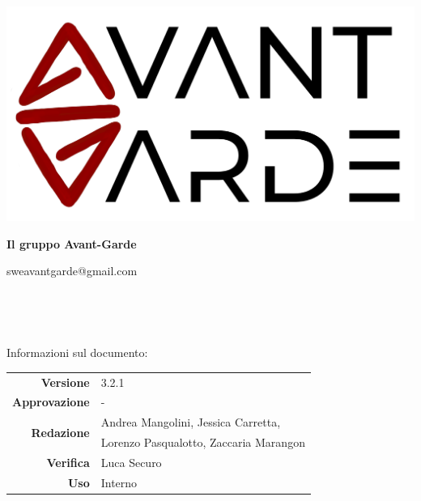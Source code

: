     \begin{titlepage}
        \begin{center}
            \includegraphics[width=\textwidth]{logo+scritta.png}

            \vspace{0.5cm}
            {\huge \textbf{Il gruppo Avant-Garde}}

            \vspace{0.4cm}
            \large{sweavantgarde@gmail.com}

            \vspace{1.5cm}
            \hrulefill\\
            \vspace{0.2cm}
            
            \textbf{\titoloDocumento}\\
           
            \hrulefill

            \vfill
            Informazioni sul documento:\\
            \vspace{0.3cm}
                \begin{tabular}{ r | l }
                    \textbf{Versione} & 3.2.1\\ %
                    \textbf{Approvazione} & -\\ %
                    \multirow{2}{*}{\textbf{Redazione}} & Andrea Mangolini, Jessica Carretta, \\ & Lorenzo Pasqualotto, Zaccaria Marangon\\ %
                    \textbf{Verifica} & Luca Securo\\ %
                    \textbf{Uso} & Interno\\ %
                \end{tabular}
        \end{center}
    \end{titlepage}
\restoregeometry